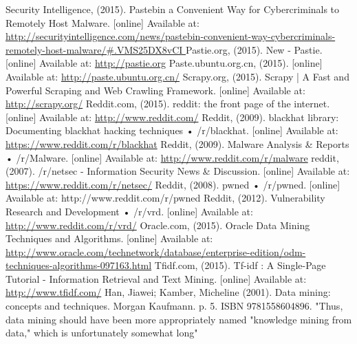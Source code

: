 \documentclass[12pt]{article}
\begin{document}
\begin{thebibliography}{99}
Security Intelligence, (2015). Pastebin a Convenient Way for Cybercriminals to Remotely Host Malware. [online] Available at: \url{http://securityintelligence.com/news/pastebin-convenient-way-cybercriminals-remotely-host-malware/#.VMS25DX8vCI }
Pastie.org, (2015). New - Pastie. [online] Available at: \url{http://pastie.org} 
 Paste.ubuntu.org.cn, (2015). [online] Available at: \url{http://paste.ubuntu.org.cn/}
Scrapy.org, (2015). Scrapy | A Fast and Powerful Scraping and Web Crawling Framework. [online] Available at: \url{http://scrapy.org/} 
Reddit.com, (2015). reddit: the front page of the internet. [online] Available at: \url{http://www.reddit.com/} 
Reddit, (2009). blackhat library: Documenting blackhat hacking techniques • /r/blackhat. [online] Available at: \url{https://www.reddit.com/r/blackhat}
Reddit, (2009). Malware Analysis \& Reports • /r/Malware. [online] Available at:   \url{http://www.reddit.com/r/malware}
reddit, (2007). /r/netsec - Information Security News \& Discussion. [online] Available at: \url{https://www.reddit.com/r/netsec/} 
Reddit, (2008). pwned • /r/pwned. [online] Available at: http://www.reddit.com/r/pwned 
Reddit, (2012). Vulnerability Research and Development • /r/vrd. [online] Available at: \url{http://www.reddit.com/r/vrd/}
Oracle.com, (2015). Oracle Data Mining Techniques and Algorithms. [online] Available at: \url{http://www.oracle.com/technetwork/database/enterprise-edition/odm-techniques-algorithms-097163.html}
Tfidf.com, (2015). Tf-idf : A Single-Page Tutorial - Information Retrieval and Text Mining. [online] Available at: \url{http://www.tfidf.com/} 
Han, Jiawei; Kamber, Micheline (2001). Data mining: concepts and techniques. Morgan Kaufmann. p. 5. ISBN 9781558604896. "Thus, data mining should have been more appropriately named "knowledge mining from data," which is unfortunately somewhat long"
\end{thebibliography}
\end{document}
